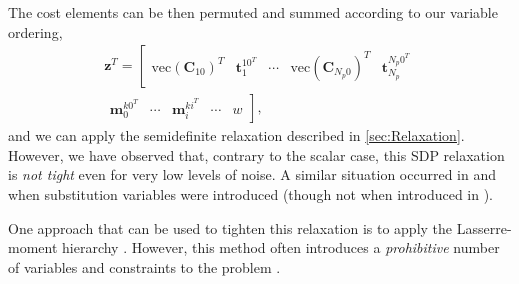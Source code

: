 \documentclass[lettersize,journal]{IEEEtran}
\newcommand{\vect}[1]{\mbox{vec}(#1)}
\newcommand{\rev}[1]{\color{red}{#1}\color{black}}
\begin{document}
The cost elements can be then permuted and summed according to our variable ordering,
\begin{multline}
	\bm{z}^T = \left[\begin{matrix}\vect{\bm{C}_{10}}^T &\bm{t}_1^{10^T} & \cdots &\vect{\bm{C}_{N_p0}}^T&\bm{t}_{N_p}^{N_p0^T} \end{matrix}\right. \\
		\left.\begin{matrix} \bm{m}_0^{k0^T} &\cdots& \bm{m}_i^{ki^T} & \cdots & w \end{matrix}\right],
\end{multline}
and we can apply the semidefinite relaxation described in \ref{sec:Relaxation}. However, we have observed that, contrary to the scalar case, this SDP relaxation is \emph{not tight} even for very low levels of noise. A similar situation occurred in \cite{brialesCertifiablyGloballyOptimal2018} and \cite{yangTEASERFastCertifiable2021} when substitution variables were introduced (though not when introduced in \cite{dumbgenSafeSmoothCertified2023}).

\rev{\section{Tightening the Relaxations}}

\rev{One of the key contributions of this paper is a concise set of redundant constraints for each of the problems presented above that is capable of tighening the their respective relaxations. In the next sections, we empirically show that these constraints are capable of restoring relaxation tightness that is otherwise destroyed by the introduction of anisotropic noise.}

One approach that can be used to tighten this relaxation is to apply the Lasserre-moment hierarchy \cite{henrionMomentSOSHierarchyLectures2021, lasserreGlobalOptimizationPolynomials2001}. However, this method often introduces a \emph{prohibitive} number of \rev{additional} variables and constraints to the problem \cite{yangCertifiablyOptimalOutlierRobust2023}. 
\end{document}
